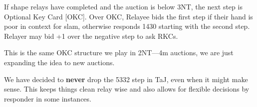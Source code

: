 \documentclass[tom-jenni]{subfile}
\begin{document}
\begin{noted}
	If shape relays have completed and the auction is below 3NT, the next step is Optional Key Card [OKC].  Over OKC, Relayee bids the first step if their hand is poor in context for slam, otherwise responds 1430 starting with the second step. 	Relayer may bid +1 over the negative step to ask RKCs.   
	
	\vspace{1em}
	
	This is the same OKC structure we play in 2NT----4m auctions, we are just expanding the idea to new auctions.
\end{noted}

We have decided to \textbf{never} drop the 5332 step in TaJ, even when it might make sense.  This keeps things clean relay wise and also allows for flexible decisions by responder in some instances.
\end{document}
